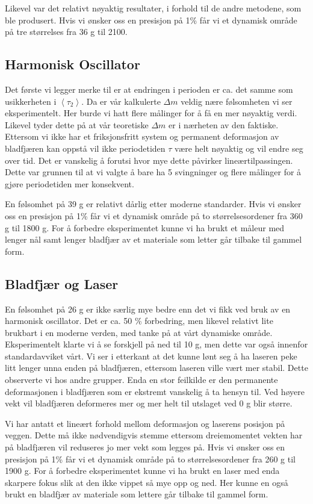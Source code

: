 \documentclass[reprint,norsk,notitlepage]{revtex4-2}
\begin{document}
Likevel var det relativt nøyaktig resultater, i forhold til de andre metodene, som ble produsert. Hvis vi ønsker oss en presisjon på 1\% får vi et dynamisk område på tre størrelses fra 36 g til 2100. 


\subsection{Harmonisk Oscillator}
Det første vi legger merke til er at endringen i perioden er ca. det samme som usikkerheten i $\left<τ_2\right>$. Da er vår kalkulerte $Δm$ veldig nære følsomheten vi ser eksperimentelt. Her burde vi hatt flere målinger for å få en mer nøyaktig verdi. Likevel tyder dette på at vår teoretiske $Δm$ er i nærheten av den faktiske. Ettersom vi ikke har et friksjonsfritt system og permanent deformasjon av bladfjæren kan oppstå vil ikke periodetiden $τ$ være helt nøyaktig og vil endre seg over tid. Det er vanskelig å forutsi hvor mye dette påvirker lineærtilpassingen. Dette var grunnen til at vi valgte å bare ha 5 svingninger og flere målinger for å gjøre periodetiden mer konsekvent. 

En følsomhet på 39 g er relativt dårlig etter moderne standarder. Hvis vi ønsker oss en presisjon på 1\% får vi et dynamisk område på to størrelsesordener fra 360 g til 1800 g. 
For å forbedre eksperimentet kunne vi ha brukt et måleur med lenger nål samt lenger bladfjær av et materiale som letter går tilbake til gammel form. 

\subsection{Bladfjær og Laser}
En følsomhet på 26 g er ikke særlig mye bedre enn det vi fikk ved bruk av en harmonisk oscillator. Det er ca. 50 \% forbedring, men likevel relativt lite brukbart i en moderne verden, med tanke på at vårt dynamiske område. Eksperimentelt klarte vi å se forskjell på ned til 10 g, men dette var også innenfor standardavviket vårt. Vi ser i etterkant at det kunne lønt seg å ha laseren peke litt lenger unna enden på bladfjæren, ettersom laseren ville vært mer stabil. Dette observerte vi hos andre grupper. 
Enda en stor feilkilde er den permanente deformasjonen i bladfjæren som er ekstremt vanskelig å ta hensyn til. Ved høyere vekt vil bladfjæren deformeres mer og mer helt til utslaget ved 0 g blir større. 

Vi har antatt et lineært forhold mellom deformasjon og laserens posisjon på veggen. Dette må ikke nødvendigvis stemme ettersom dreiemomentet vekten har på bladfjæren vil reduseres jo mer vekt som legges på. Hvis vi ønsker oss en presisjon på 1\% får vi et dynamisk område på to størrelsesordener fra 260 g til 1900 g. For å forbedre eksperimentet kunne vi ha brukt en laser med enda skarpere fokus slik at den ikke vippet så mye opp og ned. Her kunne en også brukt en bladfjær av materiale som lettere går tilbake til gammel form. 
\end{document}
